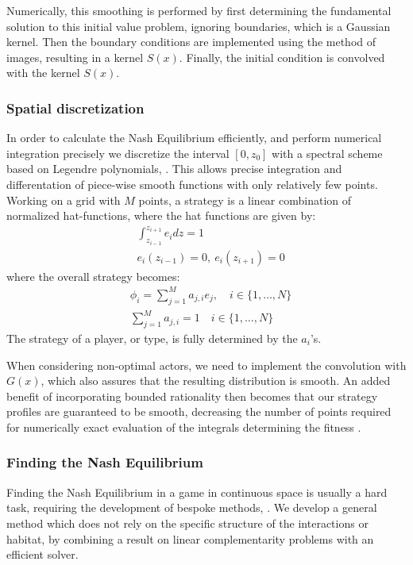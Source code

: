 Numerically, this smoothing is performed by first determining the fundamental solution to this initial value problem, ignoring boundaries, which is a Gaussian kernel. Then the boundary conditions are implemented using the method of images, resulting in a kernel $S(x)$. Finally, the initial condition is convolved with the kernel $S(x)$.


\subsubsection{Spatial discretization}
In order to calculate the Nash Equilibrium efficiently, and perform numerical integration precisely we discretize the interval $[0,z_0]$ with a spectral scheme based on Legendre polynomials, \citep{kopriva2009implementing}. This allows precise integration and differentation of piece-wise smooth functions with only relatively few points. Working on a grid with $M$ points, a strategy is a linear combination of normalized hat-functions, where the hat functions are given by:
\begin{align*}
	& \int_{z_{i-1}}^{z_{i+1}} e_i dz = 1 \\
	&e_i(z_{i-1}) = 0,~ e_i(z_{i+1}) = 0
\end{align*}
where the overall strategy becomes:
\begin{align*}
  &\phi_{i} = \sum_{j=1}^M a_{j,i} e_j, \quad i\in \{1,\dots, N\} \\
  &\sum_{j=1}^M a_{j,i} = 1 \quad i\in \{1,\dots, N\}
\end{align*}
The strategy of a player, or type, is fully determined by the $a_i$'s.


When considering non-optimal actors, we need to implement the convolution with $G(x)$, which also assures that the resulting distribution is smooth. An added benefit of incorporating bounded rationality then becomes that our strategy profiles are guaranteed to be smooth, decreasing the number of points required for numerically exact evaluation of the integrals determining the fitness .


\subsubsection{Finding the Nash Equilibrium}
Finding the Nash Equilibrium in a game in continuous space is usually a hard task, requiring the development of bespoke methods, \citep{verticalmigration, jerome}. We develop a general method which does not rely on the specific structure of the interactions or habitat, by combining a result on linear complementarity problems \citep{miller1991copositive} with an efficient solver.

